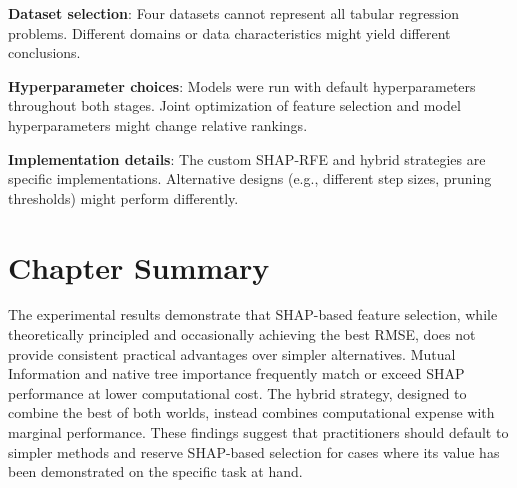 \textbf{Dataset selection}: Four datasets cannot represent all tabular regression problems. Different domains or data characteristics might yield different conclusions.

\textbf{Hyperparameter choices}: Models were run with default hyperparameters throughout both stages. Joint optimization of feature selection and model hyperparameters might change relative rankings.

\textbf{Implementation details}: The custom SHAP-RFE and hybrid strategies are specific implementations. Alternative designs (e.g., different step sizes, pruning thresholds) might perform differently.

\section{Chapter Summary}

The experimental results demonstrate that SHAP-based feature selection, while theoretically principled and occasionally achieving the best RMSE, does not provide consistent practical advantages over simpler alternatives. Mutual Information and native tree importance frequently match or exceed SHAP performance at lower computational cost. The hybrid strategy, designed to combine the best of both worlds, instead combines computational expense with marginal performance. These findings suggest that practitioners should default to simpler methods and reserve SHAP-based selection for cases where its value has been demonstrated on the specific task at hand.
